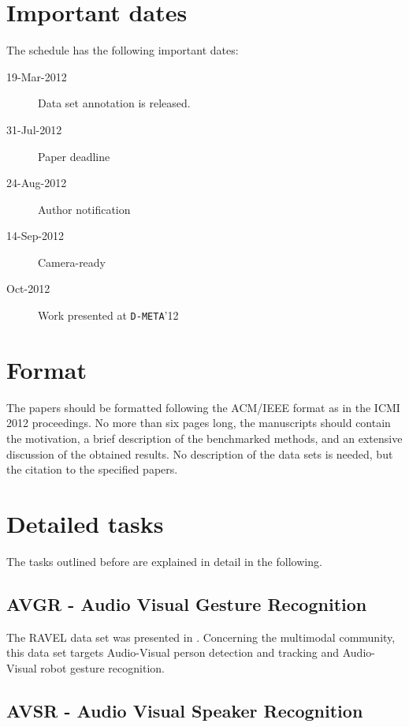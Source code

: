 \documentclass[a4paper]{article}
\begin{document}
\section{Important dates}
The schedule has the following important dates:
\begin{description}
 \item[19-Mar-2012] Data set annotation is released.
 \item[31-Jul-2012] Paper deadline
 \item[24-Aug-2012] Author notification
 \item[14-Sep-2012] Camera-ready
 \item[Oct-2012] Work presented at \texttt{D-META}'12
\end{description}

\section{Format}
The papers should be formatted following the ACM/IEEE format as in the ICMI 2012 proceedings. No more than six pages
long, the manuscripts should contain the motivation, a brief description of the benchmarked methods, and an extensive
discussion of the obtained results. No description of the data sets is needed, but the citation to the specified papers.

\section{Detailed tasks}
The tasks outlined before are explained in detail in the following.

\subsection{AVGR - Audio Visual Gesture Recognition}
The RAVEL data set was presented in \cite{Ravel}. Concerning the multimodal
community, this data set
targets Audio-Visual person detection and tracking and Audio-Visual robot gesture recognition.

\subsection{AVSR - Audio Visual Speaker Recognition}



\end{document}
